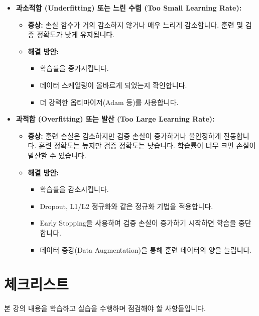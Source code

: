 \documentclass[11pt,a4paper]{article}
\theoremstyle{definition}
\begin{document}
\begin{itemize}
    \item \textbf{과소적합 (Underfitting) 또는 느린 수렴 (Too Small Learning Rate):}
    \begin{itemize}
        \item \textbf{증상:} 손실 함수가 거의 감소하지 않거나 매우 느리게 감소합니다. 훈련 및 검증 정확도가 낮게 유지됩니다.
        \item \textbf{해결 방안:}
        \begin{itemize}
            \item 학습률을 증가시킵니다.
            \item 데이터 스케일링이 올바르게 되었는지 확인합니다.
            \item 더 강력한 옵티마이저(Adam 등)를 사용합니다.
        \end{itemize}
    \end{itemize}
    \item \textbf{과적합 (Overfitting) 또는 발산 (Too Large Learning Rate):}
    \begin{itemize}
        \item \textbf{증상:} 훈련 손실은 감소하지만 검증 손실이 증가하거나 불안정하게 진동합니다. 훈련 정확도는 높지만 검증 정확도는 낮습니다. 학습률이 너무 크면 손실이 발산할 수 있습니다.
        \item \textbf{해결 방안:}
        \begin{itemize}
            \item 학습률을 감소시킵니다.
            \item Dropout, L1/L2 정규화와 같은 정규화 기법을 적용합니다.
            \item Early Stopping을 사용하여 검증 손실이 증가하기 시작하면 학습을 중단합니다.
            \item 데이터 증강(Data Augmentation)을 통해 훈련 데이터의 양을 늘립니다.
        \end{itemize}
    \end{itemize}
\end{itemize}

\newpage
\section{체크리스트}
본 강의 내용을 학습하고 실습을 수행하며 점검해야 할 사항들입니다.
\end{document}
